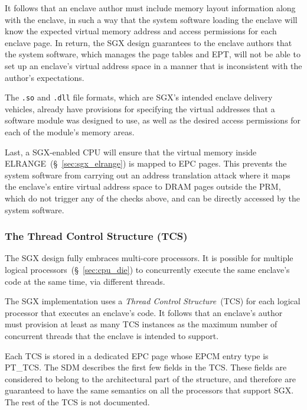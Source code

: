 It follows that an enclave author must include memory layout information along
with the enclave, in such a way that the system software loading the enclave
will know the expected virtual memory address and access permissions for each
enclave page. In return, the SGX design guarantees to the enclave authors that
the system software, which manages the page tables and EPT, will not be able to
set up an enclave's virtual address space in a manner that is inconsistent with
the author's expectations.

The \texttt{.so} and \texttt{.dll} file formats, which are SGX's intended
enclave delivery vehicles, already have provisions for specifying the virtual
addresses that a software module was designed to use, as well as the desired
access permissions for each of the module's memory areas.

Last, a SGX-enabled CPU will ensure that the virtual memory inside
ELRANGE~(\S~\ref{sec:sgx_elrange}) is mapped to EPC pages. This prevents the
system software from carrying out an address translation attack where it maps
the enclave's entire virtual address space to DRAM pages outside the PRM, which
do not trigger any of the checks above, and can be directly accessed by the
system software.


\subsubsection{The Thread Control Structure (TCS)}
\label{sec:sgx_tcs}


The SGX design fully embraces multi-core processors. It is possible for
multiple logical processors~(\S~\ref{sec:cpu_die}) to concurrently execute the
same enclave's code at the same time, via different threads.

The SGX implementation uses a \textit{Thread Control Structure}~(TCS) for each
logical processor that executes an enclave's code. It follows that an enclave's
author must provision at least as many TCS instances as the maximum number of
concurrent threads that the enclave is intended to support.

Each TCS is stored in a dedicated EPC page whose EPCM entry type is PT\_TCS.
The SDM describes the first few fields in the TCS. These fields are considered
to belong to the architectural part of the structure, and therefore are
guaranteed to have the same semantics on all the processors that support SGX.
The rest of the TCS is not documented.

